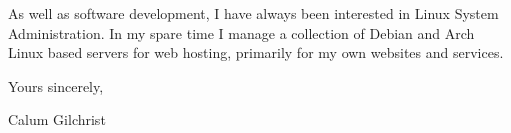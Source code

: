 As well as software development, I have always been interested in Linux System
Administration. In my spare time I manage a collection of Debian and Arch Linux
based servers for web hosting, primarily for my own websites and services.

\bigskip
Yours sincerely,


Calum Gilchrist
